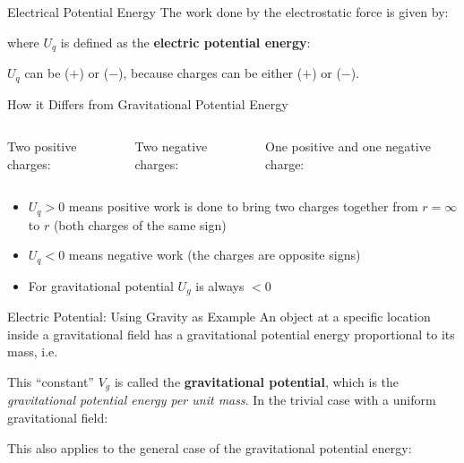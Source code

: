 \documentclass[12pt,aspectratio=169]{beamer}
\begin{document}
\begin{frame}{Electrical Potential Energy}
  The work done by the electrostatic force is given by:
  

  where $U_q$ is defined as the \textbf{electric potential energy}:
    

  $U_q$ can be ($+$) or ($-$), because charges can be either ($+$) or ($-$).
\end{frame}



\begin{frame}{How it Differs from Gravitational Potential Energy}
  \begin{columns}
    \centering
    Two positive charges:

    
    \centering
    Two negative charges:

    
    \centering
    One positive and one negative charge:

  \end{columns}
  \begin{itemize}
  \item $U_q>0$ means positive work is done to bring two charges together from
   $r=\infty$ to $r$ (both charges of the same sign)
  \item $U_q<0$ means negative work (the charges are opposite signs)
  \item For gravitational potential $U_g$ is always $<0$
  \end{itemize}
\end{frame}




\begin{frame}{Electric Potential: Using Gravity as Example}
  An object at a specific location inside a gravitational field has a
  gravitational potential energy proportional to its mass, i.e.\

  
  \vspace{-.1in}This ``constant'' $V_g$ is called the \textbf{gravitational
    potential}, which is the \emph{gravitational potential energy per unit
    mass}. In the trivial case with a uniform gravitational field:


  This also applies to the general case of the gravitational
  potential energy:
  
\end{frame}
\end{document}
